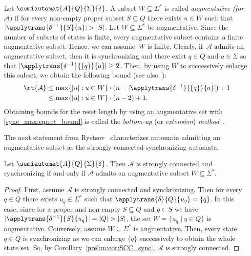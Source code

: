 
Let $\semiautomat{A}{Q}{\Sigma}{\delta}$. A subset $W \subseteq \Sigma^*$
is called \emph{augmentative (for $\mathcal A)$} if for every non-empty proper subset $S \subseteq Q$
there exists $u \in W$ such that $|\applytrans{\delta^{-1}}{S}{u}| > |S|$. Let $W \subseteq \Sigma^*$ be augmentative.
Since the number of subsets of states is finite, 
every augmentative subset contains a finite augmentative subset.
Hence, we can assume~$W$ is finite.
Clearly, if~$\mathcal A$ admits an augmentative subset,
then it is synchronizing
and there exist $q \in Q$ and $a \in \Sigma$
so that $|\applytrans{\delta^{-1}}{\{q\}}{a}| \ge 2$. Then, by using $W$ to successively enlarge
this subset, we obtain the following bound (see also~\cite[Thm.~2]{Rystsov95a}):
\begin{align}
		\rt{\mathcal A} 
		& \le \max\{ |u| : u \in W \} \cdot (n - |\applytrans{\delta^{-1}}{\{q\}}{a}|) + 1 \nonumber \\
		& \le \max\{ |u| : u \in W \} \cdot (n - 2) + 1. \label{sync_max:eqn:rt_bound}
\end{align}
Obtaining bounds for the reset length by using an augmentative set with \cref{sync_max:eqn:rt_bound}
is called the \emph{bottom-up} (or \emph{extension}) \emph{method}~\cite{DBLP:journals/ijfcs/Berlinkov11}. 

The next statement from Rystsov~\cite{Rystsov95a,Rystsov2000}
characterizes automata admitting an augmentative subset
as the strongly connected synchronizing automata.

\begin{theorem}
	\label{sync_max:thm:augmentative}
	Let $\semiautomat{A}{Q}{\Sigma}{\delta}$.	
	Then $\mathcal A$ is strongly connected and synchronizing
	if and only if $\mathcal A$ admits an augmentative subset $W \subseteq \Sigma^*$.	
\end{theorem}
\begin{proof}
    First, assume $\mathcal A$ is strongly connected and synchronizing.
	Then for every $q \in Q$ there exists $u_q \in \Sigma^*$
	such that $\applytrans{\delta}{Q}{u_q} = \{q\}$.
	In this case, since for a proper and non-empty $S \subseteq Q$
	and $q \in S$ we have $|\applytrans{\delta^{-1}}{S}{u_q}| = |Q| > |S|$,
	the set $W = \{ u_q \mid q \in Q\}$	is augmentative.
	Conversely, assume $W \subseteq \Sigma^*$
	is augmentative. Then, every state $q \in Q$ is synchronizing
	as we can enlarge $\{q\}$ successively to obtain the whole state set.
	So, by Corollary~\ref{prelim:cor:SCC_sync},
	$\mathcal A$ is strongly connected.
\end{proof}

